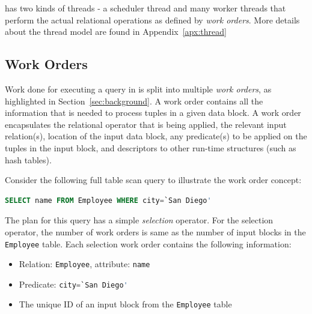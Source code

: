 \sys{} has two kinds of threads - a scheduler thread and many worker threads that perform the actual relational operations as defined by \textit{work orders}. 
More details about the thread model are found in Appendix~\ref{apx:thread}

\subsection{Work Orders}\label{ssec:workorders}
Work done for executing a query in \sys{} is split into multiple \textit{work 
orders}, as highlighted in Section~\ref{sec:background}. 
A work order contains all the information that is needed to process tuples in a given 
data block. 
A work order encapsulates the relational operator that is being applied, the relevant 
input relation(s), location of the input data block, any predicate(s) to be 
applied on the tuples in the input block, and descriptors to other run-time 
structures (such as hash tables).

Consider the following full table scan query to illustrate the work order concept:

\begin{lstlisting}[language=SQL, 
basicstyle=\ttfamily\small, 
showstringspaces=false,
keywordstyle=\color{cardinal}\bfseries, 
emph={San,Diego}, 
emphstyle=\color{bondiblue}\bfseries]
SELECT name FROM Employee WHERE city=`San Diego'
\end{lstlisting}	
\vspace{-0.4em}

The plan for this query has a simple \textit{selection} operator.  
For the selection operator, the number of work orders is same as the number of input blocks in the \verb+Employee+ table. 
Each selection work order contains the following information:
\begin{itemize}
\itemsep0.1em
\item {Relation: \verb+Employee+, attribute: \verb|name|}
\item {Predicate: \lstinline[language=SQL, 
                                   basicstyle=\ttfamily\small, 
                                   keywordstyle=\color{cardinal} \bfseries,
                                   emph={San,Diego}, 
                                   emphstyle=\color{bondiblue}\bfseries]|city=`San Diego'|}
\item {The unique ID of an input block from the \verb+Employee+ table}
\end{itemize}


